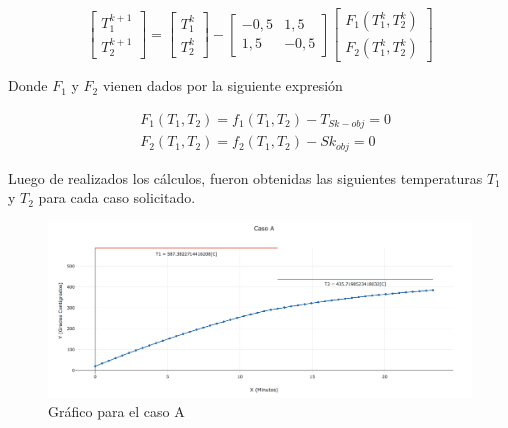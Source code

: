\documentclass[10pt,a4paper]{article}
\begin{document}
\[
  \left[ {\begin{array}{cc}
   T_{1}^{k+1}  \\
   T_{2}^{k+1}
  \end{array} } \right] =
   \left[ {\begin{array}{cc}
   T_{1}^{k}  \\
   T_{2}^{k}
  \end{array} } \right] -
  \left[ {\begin{array}{cc}
   -0,5 & 1,5 \\
    1,5 & -0,5 
  \end{array} } \right]
  \left[ {\begin{array}{cc}
   F_{1}(T_{1}^{k},T_{2}^{k})  \\
   F_{2}(T_{1}^{k},T_{2}^{k})
  \end{array} } \right]
\]

Donde $F_{1}$ y $F_{2}$ vienen dados por la siguiente expresión

\begin{align*}
    &F_{1}(T_{1},T_{2})= f_{1}(T_{1},T_{2}) - T_{Sk-obj}=0\\
    &F_{2}(T_{1},T_{2})= f_{2}(T_{1},T_{2}) - Sk_{obj}=0
\end{align*}

Luego de realizados los cálculos, fueron obtenidas las siguientes temperaturas $T_{1}$ y $T_{2}$ para cada caso solicitado.

\begin{table}[H]
     \makegapedcells
     \centering
{}
\end{table}


\begin{figure}[H]
\centering
\includegraphics[width=18cm]{Grafica-ej5-casoa.png}
\caption{Gráfico para el caso A}
\end{figure}
\end{document}
